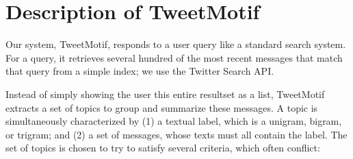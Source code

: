 \documentclass[letterpaper]{article}
\newcommand{\bto}[1]{\textcolor{blue}{\textbf{[#1 --BTO]}}}
\newcommand{\mikeyk}[1]{\textcolor{green}{\textbf{[#1 --mikeyk]}}}
\begin{document}
% 









\section{Description of TweetMotif}

Our system, TweetMotif, responds to a user query like a standard search system.  For a query, it retrieves several hundred of the most recent messages that match that query from a simple index; we use the Twitter Search API.

Instead of simply showing the user this entire resultset as a list, TweetMotif extracts a set of topics to group and summarize these messages.  A topic is simultaneously characterized by (1) a textual label, which is a unigram, bigram, or trigram; and (2) a set of messages, whose texts must all contain the label.  The set of topics is chosen to try to satisfy several criteria, which often conflict:
\end{document}
